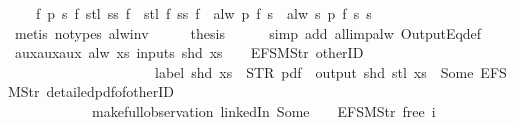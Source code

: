 \begin{isabellebody}
\ \ \ \ {\isachardoublequoteopen}{\isasymforall}f\ p\ s{\isachardot}\ f\ {\isacharparenleft}stl\ {\isacharparenleft}ss\ f{\isacharparenright}{\isacharparenright}\ {\isasymnoteq}\ stl\ {\isacharparenleft}f\ {\isacharparenleft}ss\ f{\isacharparenright}{\isacharparenright}\ {\isasymor}\ alw\ p\ {\isacharparenleft}f\ s{\isacharparenright}\ {\isacharequal}\ alw\ {\isacharparenleft}{\isasymlambda}s{\isachardot}\ p\ {\isacharparenleft}f\ s{\isacharparenright}{\isacharparenright}\ s{\isachardoublequoteclose}\isanewline
\ \ \ \ \isamarkupfalse%
\ {\isacharparenleft}metis\ {\isacharparenleft}no{\isacharunderscore}types{\isacharparenright}\ alw{\isacharunderscore}inv{\isacharparenright}\isanewline
\ \ \isamarkupfalse%
\ \isamarkupfalse%
\ {\isacharquery}thesis\isanewline
\ \ \ \ \isamarkupfalse%
\ {\isacharparenleft}simp\ add{\isacharcolon}\ all{\isacharunderscore}imp{\isacharunderscore}alw\ OutputEq{\isacharunderscore}def{\isacharparenright}\isanewline
{}\isamarkupfalse%
%
\endisatagproof
{\isafoldproof}%
%
\isadelimproof
\isanewline
%
\endisadelimproof
\isanewline
{}\isamarkupfalse%
\ aux{}{\isacharunderscore}aux{}{\isacharunderscore}aux{}{\isacharcolon}\ {\isachardoublequoteopen}alw\ {\isacharparenleft}{\isasymlambda}xs{\isachardot}\ inputs\ {\isacharparenleft}shd\ xs{\isacharparenright}\ {\isacharbang}\ {}\ {\isacharequal}\ EFSM{\isachardot}Str\ {\isacharprime}{\isacharprime}otherID{\isacharprime}{\isacharprime}\ {\isasymlongrightarrow}\isanewline
\ \ \ \ \ \ \ \ \ \ \ \ \ \ \ \ \ \ \ \ \ label\ {\isacharparenleft}shd\ xs{\isacharparenright}\ {\isacharequal}\ STR\ {\isacharprime}{\isacharprime}pdf{\isacharprime}{\isacharprime}\ {\isasymlongrightarrow}\ output\ {\isacharparenleft}shd\ {\isacharparenleft}stl\ xs{\isacharparenright}{\isacharparenright}\ {\isasymnoteq}\ {\isacharbrackleft}Some\ {\isacharparenleft}EFSM{\isachardot}Str\ {\isacharprime}{\isacharprime}detailed{\isacharunderscore}pdf{\isacharunderscore}of{\isacharunderscore}otherID{\isacharprime}{\isacharprime}{\isacharparenright}{\isacharbrackright}{\isacharparenright}\isanewline
\ \ \ \ \ \ \ \ \ \ \ \ {\isacharparenleft}make{\isacharunderscore}full{\isacharunderscore}observation\ linkedIn\ {\isacharparenleft}Some\ {}{\isacharparenright}\ {\isacharless}{}\ {\isacharcolon}{\isacharequal}\ EFSM{\isachardot}Str\ {\isacharprime}{\isacharprime}free{\isacharprime}{\isacharprime}{\isachargreater}\ i{\isacharparenright}{\isachardoublequoteclose}\isanewline

\end{isabellebody}
